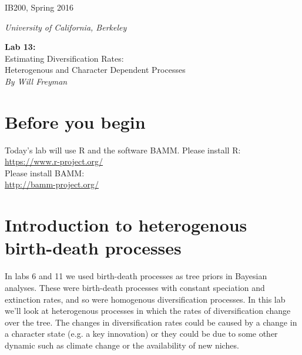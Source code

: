 \documentclass[11pt]{article}
\begin{document}
\noindent
\large
\begin{minipage}{0.5\textwidth}
\begin{flushleft} 
IB200, Spring 2016
\end{flushleft}
\end{minipage}
\begin{minipage}{0.5\textwidth}
\begin{flushright} 
\textit{University of California, Berkeley}
\end{flushright}
\end{minipage}

\vspace{0.5cm}


\begin{center}
\Large \textbf{Lab 13:} \\
Estimating Diversification Rates: \\
Heterogenous and Character Dependent Processes \\
\normalsize
\textit{By Will Freyman} \\
\end{center}

\vspace{0.5cm}

\section{Before you begin}

Today's lab will use R and the software BAMM.
Please install R: \\
\url{https://www.r-project.org/} \\
Please install BAMM: \\
\url{http://bamm-project.org/}

\section{Introduction to heterogenous birth-death processes}

In labs 6 and 11 we used birth-death processes
as tree priors in Bayesian analyses.
These were birth-death processes with constant
speciation and extinction rates, and so
were homogenous diversification processes.
In this lab we'll look at heterogenous processes
in which the rates of diversification change 
over the tree.
The changes in diversification rates could be
caused by a change in a character state 
(e.g. a key innovation)
or they could be due to some other 
dynamic such as climate change or the availability of new niches.
\end{document}
